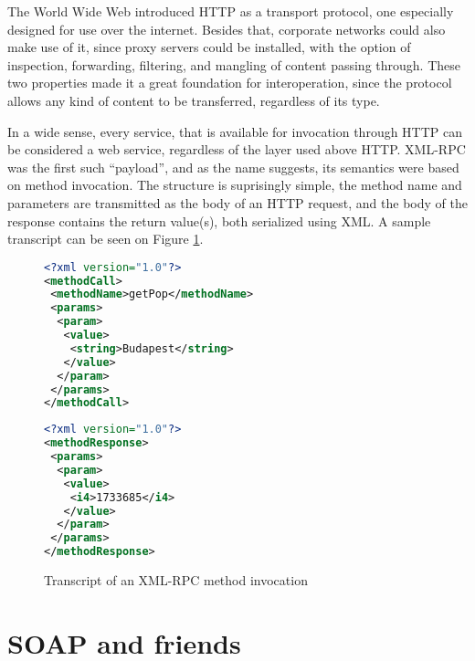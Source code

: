 The World Wide Web introduced HTTP as a transport protocol, one especially designed for use over the internet. Besides that, corporate networks could also make use of it, since proxy servers could be installed, with the option of inspection, forwarding, filtering, and mangling of content passing through. These two properties made it a great foundation for interoperation, since the protocol allows any kind of content to be transferred, regardless of its type.

In a wide sense, every service, that is available for invocation through HTTP can be considered a web service, regardless of the layer used above HTTP. XML-RPC was the first such ``payload'', and as the name suggests, its semantics were based on method invocation. The structure is suprisingly simple, the method name and parameters are transmitted as the body of an HTTP request, and the body of the response contains the return value(s), both serialized using XML. A sample transcript can be seen on Figure \ref{fig:xmlrpc-sample}.

\begin{figure}[htbp]
 \centering
 \begin{minipage}[t]{0.56\linewidth}
  \centering
  \begin{lstlisting}[language=XML, numbers=off]
<?xml version="1.0"?>
<methodCall>
 <methodName>getPop</methodName>
 <params>
  <param>
   <value>
    <string>Budapest</string>
   </value>
  </param>
 </params>
</methodCall>
  \end{lstlisting}
 \end{minipage}
 \hspace{0.5cm}
 \begin{minipage}[t]{0.37\linewidth}
  \centering
  \begin{lstlisting}[language=XML, numbers=off]
<?xml version="1.0"?>
<methodResponse>
 <params>
  <param>
   <value>
    <i4>1733685</i4>
   </value>
  </param>
 </params>
</methodResponse>
  \end{lstlisting}
 \end{minipage}
 \caption{Transcript of an XML-RPC method invocation}
 \label{fig:xmlrpc-sample}
\end{figure}

\section{SOAP and friends}

